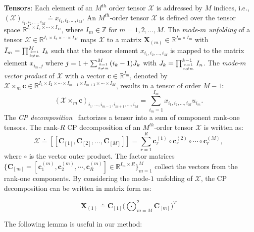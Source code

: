 \documentclass[runningheads]{llncs}
\newcommand{\realnum}{\mathbb{R}}
\providecommand{\bmcal}[1]{\bm{\mathcal{#1}}}
\providecommand{\matnot}[1]{_{[{#1}]}}
\providecommand{\citep}{\cite}
\begin{document}
\textbf{Tensors}: Each element of an $M^{th}$ order tensor $\bmcal{X}$ is addressed by $M$ indices, i.e., $(\bmcal{X})_{i_{1}, i_{2}, \ldots, i_{M}} \doteq x_{i_{1}, i_{2}, \ldots, i_{M}}$. An $M^{th}$-order tensor $\bmcal{X}$ is  defined over the
tensor space $\realnum^{I_{1} \times I_{2} \times \cdots \times
I_{M}}$, where $I_{m} \in \mathbb{Z}$ for $m=1,2,\ldots,M$. 
 The \textit{mode-$m$ unfolding} of a tensor $\bmcal{X} \in
 \realnum^{I_1 \times I_2 \times \cdots \times I_M}$ maps
 $\bmcal{X}$ to a matrix $\bm{X}_{(m)} \in \realnum^{I_{m}
 \times \bar{I}_{m}}$ with $\bar{I}_{m}= \prod_{k=1 \atop k  \neq m}^M I_k $ such
 that the tensor element $x_{i_1, i_2, \ldots, i_M}$ is
 mapped to the matrix element $x_{i_{m}, j}$ where
 $j=1 + \sum_{k=1 \atop k \neq m}^M (i_k - 1) J_k$ with $J_k =
\prod_{n =1 \atop n \neq m}^{k-1} I_n $. 
The \textit{mode-$m$ vector product} of $\bmcal{X}$ with a
vector $\bm{c} \in \realnum^{I_m}$, denoted by
$\bmcal{X} \times_{m} \bm{c} \in \realnum^{I_{1}\times
I_{2}\times\cdots\times I_{m-1}  \times I_{m+1} \times
\cdots \times I_{M}} $, results in a tensor of order $M-1$:
\begin{equation}\label{E:Tensor_Mode_n}
(\bmcal{X} \times_{m} \bm{c})_{i_1, \ldots, i_{m-1}, i_{m+1},
\ldots, i_{M}} = \sum_{i_m=1}^{I_m} x_{i_1, i_2, \ldots, i_{M}} u_{i_m}.
\end{equation}
The \textit{CP decomposition}~\citep{kolda2009tensor} factorizes a tensor into a sum of component rank-one tensors. The rank-$R$ CP decomposition of an $M^{th}$-order tensor $\bmcal{X}$ is written as:
 \begin{equation}\label{E:CP}
\bmcal{X}  \doteq [\![ \bm{C}\matnot{1}, \bm{C}\matnot{2}, \ldots, \bm{C}\matnot{M}  ]\!] =  \sum_{r=1}^R \bm{c}_r^{(1)}  \circ \bm{c}_r^{(2)}  \circ \cdots \circ \bm{c}_r^{(M)},
\end{equation}
where $\circ$ is the vector outer product. The factor matrices $\big\{ \bm{C}\matnot{m} = [\bm{c}_1^{(m)},\bm{c}_2^{(m)}, \cdots, \bm{c}_R^{(m)} ] \in \mathbb{R}^{I_m \times R} \big\}_{m=1}^{M}$ collect 
the vectors from the rank-one components. By considering the mode-$1$ unfolding of $\bmcal{X}$, the CP decomposition can be written in matrix form as: 

 \begin{equation}
 \label{eq:polygan_cp_unfolding}
\bm{X}_{(1)}  
\doteq \bm{C}\matnot{1} \bigg( \bigodot_{m = M}^{2} \bm{C}\matnot{m}\bigg)^T
\end{equation}


The following lemma is useful in our method: 
\end{document}
